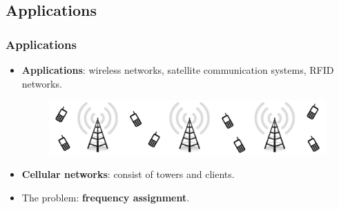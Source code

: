 \documentclass[xcolor=dvipsnames,aspectratio=1610]{beamer}
\begin{document}

  \subsection{Applications}


  \begin{frame}
    \frametitle{Applications}

    \begin{itemize}
      \item \textbf{Applications}: wireless networks, satellite communication systems, RFID networks.

      \pause
      \vfill

      \begin{figure}[h]
        \centering
        \includegraphics[width=12cm]{../figures/towers-slides.pdf}
      \end{figure}

      \vfill

      \item \textbf{Cellular networks}: consist of towers and clients.
      \pause
      \item The problem: \textbf{frequency assignment}.

    \end{itemize}

  \end{frame}
\end{document}
